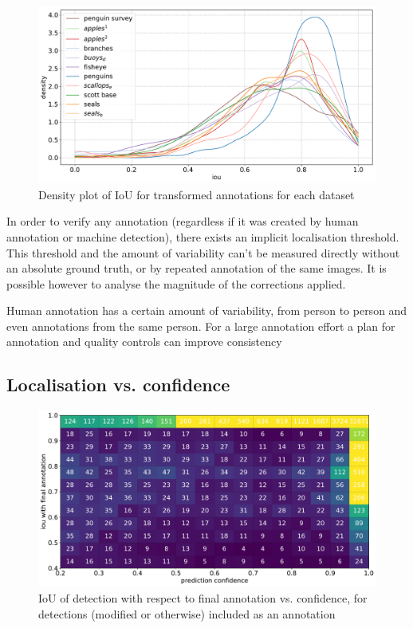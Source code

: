 \begin{figure}[ht]
\centering
\includegraphics[width=1.0\linewidth]{charts/scatters/iou_dataset.pdf}
\caption{ Density plot of IoU for transformed annotations for each dataset }
\label{fig:density_iou}
\end{figure}



In order to verify any annotation (regardless if it was created by human annotation or machine detection), there exists an implicit localisation threshold. This threshold and the amount of variability can't be measured directly without an absolute ground truth, or by repeated annotation of the same images. It is possible however to analyse the magnitude of the corrections applied.

Human annotation has a certain amount of variability, from person to person and even annotations from the same person. For a large annotation effort a plan for annotation and quality controls can improve consistency



\subsection{Localisation vs. confidence}
\label{sec:localisation_confidence}

\begin{figure}[ht]
\centering
\includegraphics[width=1.0\linewidth]{charts/scatters/confidence_iou.pdf}
\caption{ IoU of detection with respect to final annotation vs. confidence, for detections (modified or otherwise) included as an annotation }
\label{fig:iou_confidence}
\end{figure}

